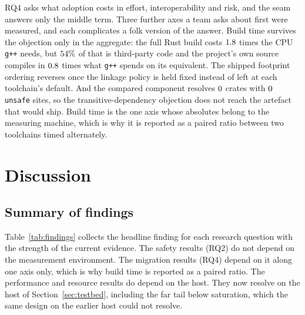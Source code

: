 \documentclass[english,oneside,a4paper,censored,csm,software-track-2020]{HYthesisML}
\begin{document}
RQ4 asks what adoption costs in effort, interoperability and risk, and the seam answers only the
middle term. Three further axes a team asks about first were measured, and
each complicates a folk version of the answer. Build time survives the objection only in the
aggregate: the full Rust build costs $1.8$ times the CPU \texttt{g++} needs, but
$54\%$ of that is third-party code and the project's own source compiles in
$0.8$ times what \texttt{g++} spends on its equivalent. The shipped
footprint ordering reverses once the linkage policy is held fixed instead of left at each
toolchain's default. And the compared component resolves $0$ crates with $0$
\texttt{unsafe} sites, so the transitive-dependency objection does not reach the artefact that
would ship. Build time is the one axis whose absolutes belong to the measuring machine, which is
why it is reported as a paired ratio between two toolchains timed alternately.

\chapter{Discussion\label{chapter:discussion}}

\section{Summary of findings}
Table~\ref{tab:findings} collects the headline finding for each research question with the
strength of the current evidence. The safety results (RQ2) do not depend on the measurement
environment. The migration results (RQ4) depend on it along one axis only, which is why build
time is reported as a paired ratio. The performance and resource results do depend on the host.
They now resolve on the host of Section~\ref{sec:testbed}, including the far tail below
saturation, which the same design on the earlier host could not resolve.
\end{document}
